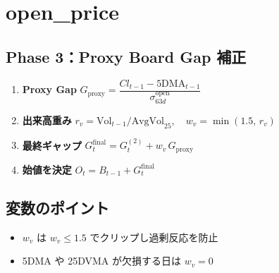 
\section*{open\_price}\nopagebreak[4]

\subsection*{Phase 3：Proxy Board Gap 補正}\nopagebreak[4]
\begin{flushleft}
\begin{enumerate}
  \item \textbf{Proxy Gap}\;
        \( G_{\text{proxy}}
           = \dfrac{Cl_{t-1}-\text{5DMA}_{t-1}}{\sigma_{63d}^{\text{open}}} \)

  \item \textbf{出来高重み}\;
        \( r_v = \text{Vol}_{t-1} / \text{AvgVol}_{25},\quad
           w_v = \min(1.5,\,r_v) \)

  \item \textbf{最終ギャップ}\;
        \( G_t^{\text{final}} = G_t^{(2)} + w_v\,G_{\text{proxy}} \)

  \item \textbf{始値を決定}\;
        \( O_t = B_{t-1} + G_t^{\text{final}} \)
\end{enumerate}
\end{flushleft}

\subsection*{変数のポイント}
\begin{flushleft}
\begin{itemize}
  \item \(w_v\) は \(w_v \le 1.5\) でクリップし過剰反応を防止  
  \item 5DMA や 25DVMA が欠損する日は \(w_v = 0\)
\end{itemize}
\end{flushleft}

